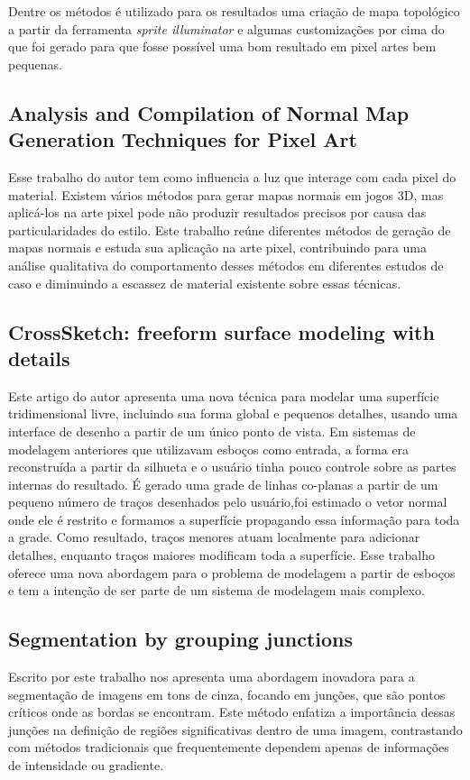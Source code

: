Dentre os métodos é utilizado para os resultados uma criação de mapa topológico a partir da ferramenta \textit{sprite illuminator} e algumas customizações por cima do que foi gerado para que fosse possível uma bom resultado em pixel artes bem pequenas.

\subsection{Analysis and Compilation of Normal Map Generation Techniques for Pixel Art}

Esse trabalho do autor  tem como influencia a luz que interage com cada pixel do material. Existem vários métodos para gerar mapas normais em jogos 3D, mas aplicá-los na arte pixel pode não produzir resultados precisos por causa das particularidades do estilo. Este trabalho reúne diferentes métodos de geração de mapas normais e estuda sua aplicação na arte pixel, contribuindo para uma análise qualitativa do comportamento desses métodos em diferentes estudos de caso e diminuindo a escassez de material existente sobre essas técnicas.

\subsection{CrossSketch: freeform surface modeling with details}

Este artigo do autor  apresenta uma nova técnica para modelar uma superfície tridimensional livre, incluindo sua forma global e pequenos detalhes, usando uma interface de desenho a partir de um único ponto de vista. Em sistemas de modelagem anteriores que utilizavam esboços como entrada, a forma era reconstruída a partir da silhueta e o usuário tinha pouco controle sobre as partes internas do resultado. É gerado uma grade de linhas co-planas a partir de um pequeno número de traços desenhados pelo usuário,foi estimado o vetor normal onde ele é restrito e formamos a superfície propagando essa informação para toda a grade. Como resultado, traços menores atuam localmente para adicionar detalhes, enquanto traços maiores modificam toda a superfície. Esse trabalho oferece uma nova abordagem para o problema de modelagem a partir de esboços e tem a intenção de ser parte de um sistema de modelagem mais complexo.

\subsection{Segmentation by grouping junctions}

Escrito por  este trabalho nos apresenta uma abordagem inovadora para a segmentação de imagens em tons de cinza, focando em junções, que são pontos críticos onde as bordas se encontram. 
Este método enfatiza a importância dessas junções na definição de regiões significativas dentro de uma imagem, contrastando com métodos tradicionais que frequentemente dependem apenas de informações de intensidade ou gradiente.
